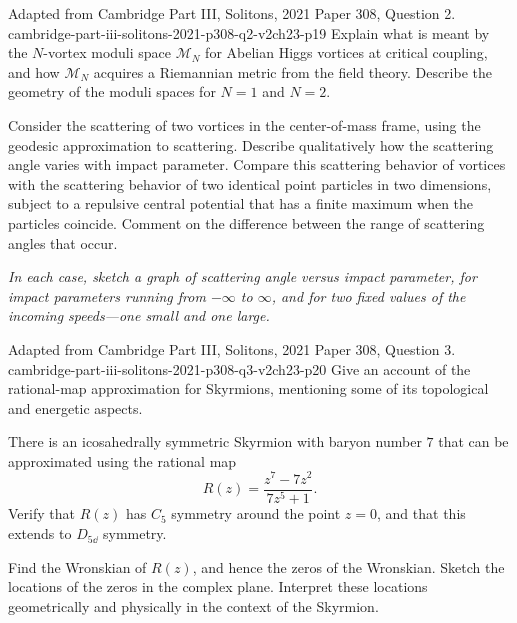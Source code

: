 \begin{enumerate}
  {Adapted from Cambridge Part III, Solitons, 2021 Paper 308,
  Question 2.}
  {cambridge-part-iii-solitons-2021-p308-q2-v2ch23-p19}
  Explain what is meant by the \(N\)-vortex moduli space
  \(\mathcal M_N\) for Abelian Higgs vortices at critical coupling, and
  how \(\mathcal M_N\) acquires a Riemannian metric from the field theory.
  Describe the geometry of the moduli spaces for \(N=1\) and \(N=2\).

  Consider the scattering of two vortices in the center-of-mass frame,
  using the geodesic approximation to scattering.  Describe qualitatively
  how the scattering angle varies with impact parameter.  Compare this
  scattering behavior of vortices with the scattering behavior of two
  identical point particles in two dimensions, subject to a repulsive
  central potential that has a finite maximum when the particles coincide.
  Comment on the difference between the range of scattering angles that
  occur.

  \emph{In each case, sketch a graph of scattering angle versus impact
  parameter, for impact parameters running from \(-\infty\) to \(\infty\),
  and for two fixed values of the incoming speeds---one small and one
  large.}

  {Adapted from Cambridge Part III, Solitons, 2021 Paper 308,
  Question 3.}
  {cambridge-part-iii-solitons-2021-p308-q3-v2ch23-p20}
  Give an account of the rational-map approximation for Skyrmions,
  mentioning some of its topological and energetic aspects.

  There is an icosahedrally symmetric Skyrmion with baryon number \(7\)
  that can be approximated using the rational map
  \[
    R(z)=\frac{z^7-7z^2}{7z^5+1}.
  \]
  Verify that \(R(z)\) has \(C_5\) symmetry around the point \(z=0\), and
  that this extends to \(D_{5\dd}\) symmetry.

  Find the Wronskian of \(R(z)\), and hence the zeros of the Wronskian.
  Sketch the locations of the zeros in the complex plane.  Interpret these
  locations geometrically and physically in the context of the Skyrmion.

\end{enumerate}
